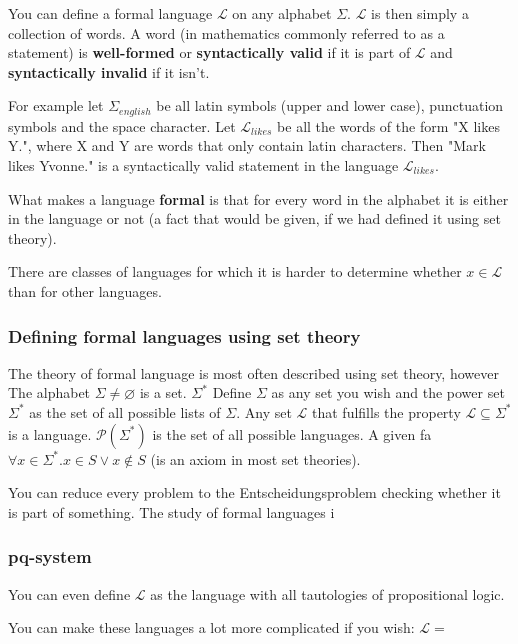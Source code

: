 You can define a formal language $\mathcal{L}$ on any alphabet $\Sigma$. $\mathcal{L}$ is then simply a collection of words.
A word (in mathematics commonly referred to as a statement) is \textbf{well-formed} or \textbf{syntactically valid} if it is part of $\mathcal{L}$ and \textbf{syntactically invalid} if it isn't.

For example let $\Sigma_{english}$ be all latin symbols (upper and lower case), punctuation symbols and the space character. Let $\mathcal{L}_{likes}$ be all the words of the form "X likes Y.", where X and Y are words that only contain latin characters. Then "Mark likes Yvonne." is a syntactically valid statement in the language $\mathcal{L}_{likes}$.

What makes a language \textbf{formal} is that for every word in the alphabet it is either in the language or not (a fact that would be given, if we had defined it using set theory).



There are classes of languages for which it is harder to determine whether $x \in \mathcal{L}$ than for other languages.

\subsubsection{Defining formal languages using set theory}
The theory of formal language is most often described using set theory, however 
The alphabet $\Sigma \neq \varnothing$ is a set.
$\Sigma^*$
Define $\Sigma$ as any set you wish and the power set $\Sigma^*$ as the set of all possible lists of $\Sigma$.
Any set $\mathcal{L}$ that fulfills the property $\mathcal{L} \subseteq \Sigma^*$ is a language.
$\mathcal{P}(\Sigma^*)$ is the set of all possible languages.
A given fa
$\forall x \in \Sigma^*. x \in S \vee x \notin S$ (is an axiom in most set theories).




You can reduce every problem to the Entscheidungsproblem checking whether it is part of something.
The study of formal languages i
\subsubsection{pq-system}

You can even define $\mathcal{L}$ as the language with all tautologies of propositional logic.

You can make these languages a lot more complicated if you wish: $\mathcal{L}=$ 


